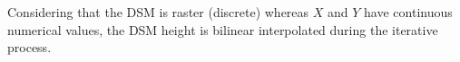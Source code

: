 Considering that the DSM is raster (discrete) whereas $X$ and $Y$ have continuous numerical values, the DSM height is bilinear interpolated during the iterative process.






















